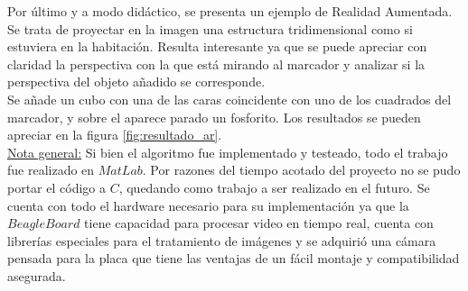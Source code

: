 \documentclass[main]{subfiles}
\begin{document}
Por último y a modo didáctico, se presenta un ejemplo de Realidad Aumentada. Se trata de proyectar en la imagen una estructura tridimensional como si estuviera en la habitación. Resulta interesante ya que se puede apreciar con claridad la perspectiva con la que está mirando al marcador y analizar si la perspectiva del objeto añadido se corresponde.\\

Se añade un cubo con una de las caras coincidente con uno de los cuadrados del marcador, y sobre el aparece parado un fosforito. Los resultados se pueden apreciar en la figura \ref{fig:resultado_ar}.\\[25pt]

\underline{Nota general:} Si bien el algoritmo fue implementado y testeado, todo el trabajo fue realizado en $MatLab$. Por razones del tiempo acotado del proyecto no se pudo portar el código a $C$, quedando como trabajo a ser realizado en el futuro. Se cuenta con todo el hardware necesario para su implementación ya que la $BeagleBoard$ tiene capacidad para procesar video en tiempo real, cuenta con librerías especiales para el tratamiento de imágenes y se adquirió una cámara pensada para la placa que tiene las ventajas de un fácil montaje y compatibilidad asegurada.
\end{document}

